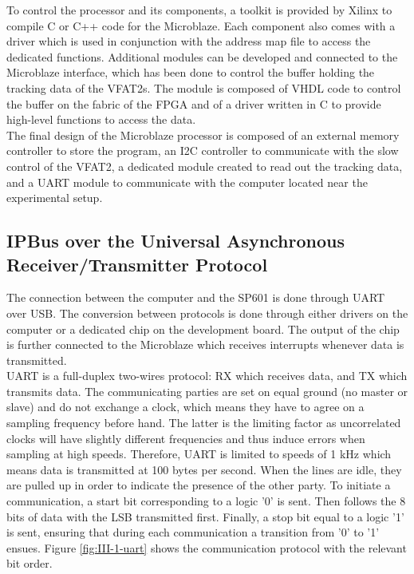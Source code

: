       To control the processor and its components, a toolkit is provided by Xilinx to compile C or C++ code for the Microblaze. Each component also comes with a driver which is used in conjunction with the address map file to access the dedicated functions. Additional modules can be developed and connected to the Microblaze interface, which has been done to control the buffer holding the tracking data of the VFAT2s. The module is composed of VHDL code to control the buffer on the fabric of the FPGA and of a driver written in C to provide high-level functions to access the data. \\

      The final design of the Microblaze processor is composed of an external memory controller to store the program, an I2C controller to communicate with the slow control of the VFAT2, a dedicated module created to read out the tracking data, and a UART module to communicate with the computer located near the experimental setup.

    \subsection{IPBus over the Universal Asynchronous Receiver/Transmitter Protocol}

      The connection between the computer and the SP601 is done through UART over USB. The conversion between protocols is done through either drivers on the computer or a dedicated chip on the development board. The output of the chip is further connected to the Microblaze which receives interrupts whenever data is transmitted. \\

      UART is a full-duplex two-wires protocol: RX which receives data, and TX which transmits data. The communicating parties are set on equal ground (no master or slave) and do not exchange a clock, which means they have to agree on a sampling frequency before hand. The latter is the limiting factor as uncorrelated clocks will have slightly different frequencies and thus induce errors when sampling at high speeds. Therefore, UART is limited to speeds of 1 kHz which means data is transmitted at 100 bytes per second. When the lines are idle, they are pulled up in order to indicate the presence of the other party. To initiate a communication, a start bit corresponding to a logic '0' is sent. Then follows the 8 bits of data with the LSB transmitted first. Finally, a stop bit equal to a logic '1' is sent, ensuring that during each communication a transition from '0' to '1' ensues. Figure \ref{fig:III-1-uart} shows the communication protocol with the relevant bit order. \\

